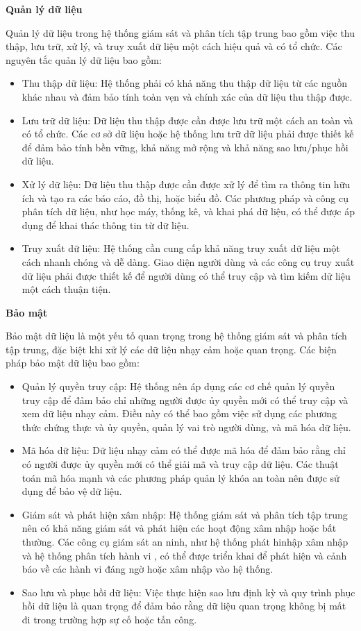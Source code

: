\textbf{Quản lý dữ liệu}
    
Quản lý dữ liệu trong hệ thống giám sát và phân tích tập trung bao gồm việc thu thập, lưu trữ, xử lý, và truy xuất dữ liệu một cách hiệu quả và có tổ chức. Các nguyên tắc quản lý dữ liệu bao gồm:

\begin{itemize}
    \item Thu thập dữ liệu: Hệ thống phải có khả năng thu thập dữ liệu từ các nguồn khác nhau và đảm bảo tính toàn vẹn và chính xác của dữ liệu thu thập được.
    \item Lưu trữ dữ liệu: Dữ liệu thu thập được cần được lưu trữ một cách an toàn và có tổ chức. Các cơ sở dữ liệu hoặc hệ thống lưu trữ dữ liệu phải được thiết kế để đảm bảo tính bền vững, khả năng mở rộng và khả năng sao lưu/phục hồi dữ liệu.
    \item Xử lý dữ liệu: Dữ liệu thu thập được cần được xử lý để tìm ra thông tin hữu ích và tạo ra các báo cáo, đồ thị, hoặc biểu đồ. Các phương pháp và công cụ phân tích dữ liệu, như học máy, thống kê, và khai phá dữ liệu, có thể được áp dụng để khai thác thông tin từ dữ liệu.
    \item Truy xuất dữ liệu: Hệ thống cần cung cấp khả năng truy xuất dữ liệu một cách nhanh chóng và dễ dàng. Giao diện người dùng và các công cụ truy xuất dữ liệu phải được thiết kế để người dùng có thể truy cập và tìm kiếm dữ liệu một cách thuận tiện.
\end{itemize}

\textbf{Bảo mật}

Bảo mật dữ liệu là một yếu tố quan trọng trong hệ thống giám sát và phân tích tập trung, đặc biệt khi xử lý các dữ liệu nhạy cảm hoặc quan trọng. Các biện pháp bảo mật dữ liệu bao gồm:
\begin{itemize}
    \item Quản lý quyền truy cập: Hệ thống nên áp dụng các cơ chế quản lý quyền truy cập để đảm bảo chỉ những người được ủy quyền mới có thể truy cập và xem dữ liệu nhạy cảm. Điều này có thể bao gồm việc sử dụng các phương thức chứng thực và ủy quyền, quản lý vai trò người dùng, và mã hóa dữ liệu.
    \item Mã hóa dữ liệu: Dữ liệu nhạy cảm có thể được mã hóa để đảm bảo rằng chỉ có người được ủy quyền mới có thể giải mã và truy cập dữ liệu. Các thuật toán mã hóa mạnh và các phương pháp quản lý khóa an toàn nên được sử dụng để bảo vệ dữ liệu.
    \item Giám sát và phát hiện xâm nhập: Hệ thống giám sát và phân tích tập trung nên có khả năng giám sát và phát hiện các hoạt động xâm nhập hoặc bất thường. Các công cụ giám sát an ninh, như hệ thống phát hinhập xâm nhập và hệ thống phân tích hành vi , có thể được triển khai để phát hiện và cảnh báo về các hành vi đáng ngờ hoặc xâm nhập vào hệ thống.
    \item Sao lưu và phục hồi dữ liệu: Việc thực hiện sao lưu định kỳ và quy trình phục hồi dữ liệu là quan trọng để đảm bảo rằng dữ liệu quan trọng không bị mất đi trong trường hợp sự cố hoặc tấn công.
\end{itemize}

